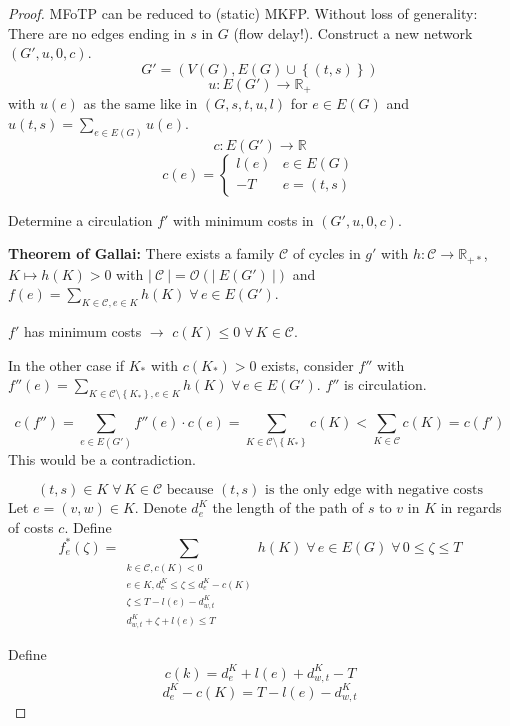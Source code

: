 \documentclass{article}
\newcommand{\card}[1]{\left|\:\!#1\:\!\right|}
\newcommand{\set}[1]{\left\{#1\right\}}
\newcommand{\fall}{\;\forall\,}
\begin{document}
\begin{proof}
  MFoTP can be reduced to (static) MKFP.
  Without loss of generality: There are no edges ending in $s$ in $G$ (flow delay!).
  Construct a new network $(G', u, 0, c)$.
  \[ G' = (V(G), E(G) \cup \set{(t, s)}) \]
  \[ u: E(G') \rightarrow \mathbb{R}_+ \]
  with $u(e)$ as the same like in $(G, s, t, u, l)$ for $e \in E(G)$ and $u(t, s) = \sum_{e \in E(G)} u(e)$.
  \[ c: E(G') \rightarrow \mathbb{R} \]
  \[
    c(e) = \left\{\begin{array}{ll}
      l(e) & e \in E(G) \\
      -T & e = (t, s)
    \end{array}\right.
  \]

  Determine a circulation $f'$ with minimum costs in $(G', u, 0, c)$.

  \textbf{Theorem of Gallai:} There exists a family $\mathcal{C}$ of cycles in $g'$ with $h: \mathcal{C} \rightarrow \mathbb{R}_{+*}$, $K \mapsto h(K) > 0$ with $\card{\mathcal{C}} = \mathcal{O}(\card{E(G')})$ and $f(e) = \sum_{K \in \mathcal{C}, e \in K} h(K) \fall e \in E(G')$.

  $f'$ has minimum costs $\rightarrow$ $c(K) \leq 0 \fall K \in \mathcal{C}$.

  In the other case if $K_*$ with $c(K_*) > 0$ exists, consider $f''$ with $f''(e) = \sum_{K \in \mathcal{C} \setminus \set{K_*}, e \in K} h(K) \fall e \in E(G')$. $f''$ is circulation.

  \[
    c(f'') = \sum_{e \in E(G')} f''(e) \cdot c(e)
      = \sum_{K \in \mathcal{C} \setminus \set{K_*}} c(K)
      < \sum_{K \in \mathcal{C}} c(K)
      = c(f')
  \]
  This would be a contradiction.

  \[
    (t, s) \in K \fall K \in \mathcal{C} \text{ because $(t, s)$ is the only edge with negative costs}
  \]
  Let $e = (v, w) \in K$. Denote $d_e^K$ the length of the path of $s$ to $v$ in $K$ in regards of costs $c$. Define
  \[
    f_e^*(\zeta) =
      \sum_{\substack{
        k \in \mathcal{C}, c(K) < 0 \\
        e \in K, d_e^K \leq \zeta \leq d_e^K - c(K) \\
        \zeta \leq T - l(e) - d_{w,t}^K \\
        d_{w,t}^K + \zeta + l(e) \leq T}}
      h(K)
      \fall e \in E(G) \fall 0 \leq \zeta \leq T
  \]

  Define
  \[ c(k) = d_e^K + l(e) + d_{w,t}^K - T \]
  \[ d_e^K - c(K) = T - l(e) - d_{w,t}^K \]


\end{proof}
\end{document}
